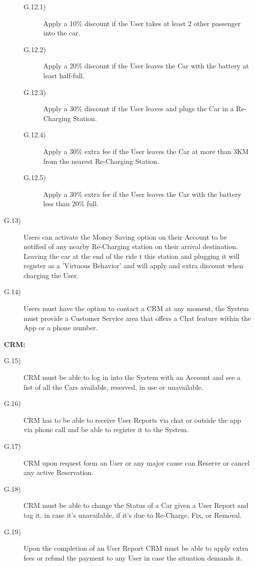 \documentclass[a4paper]{article}
\begin{document}
\begin{description}
\begin{description}
\item [G.12.1)]Apply a 10\% discount if the User takes at least 2 other passenger into the car.
\item [G.12.2)]Apply a 20\% discount if the User leaves the Car with the battery at least half-full.
\item [G.12.3)]Apply a 30\% discount if the User leaves and plugs the Car in a Re-Charging Station.
\item [G.12.4)]Apply a 30\% extra fee if the User leaves the Car at more than 3KM from the nearest Re-Charging Station.
\item [G.12.5)]Apply a 30\% extra fee if the User leaves the Car with the battery less than 20\% full.
\end{description}
\item [G.13)]Users can activate the Money Saving option on their Account to be notified of any nearby Re-Charging station on their arrival destination. Leaving the car at the end of the ride t this station and plugging it will register as a 'Virtuous Behavior' and will apply and extra discount when charging the User.
\item [G.14)]Users must have the option to contact a CRM at any moment, the System must provide a Customer Service area that offers a Chat feature within the App or a phone number.
\end{description}
\textbf{CRM:}
\begin{description}
\item [G.15)]CRM must be able to log in into the System with an Account and see a list of all the Cars available, reserved, in use or unavailable.
\item [G.16)]CRM has to be able to receive User Reports via chat or outside the app via phone call and be able to register it to the System.
\item [G.17)]CRM upon request form an User or any major cause can Reserve or cancel any active Reservation.
\item [G.18)]CRM must be able to change the Status of a Car given a User Report and tag it, in case it's unavailable, if it's due to Re-Charge, Fix, or Removal.
\item [G.19)]Upon the completion of an User Report CRM must be able to apply extra fees or refund the payment to any User in case the situation demands it.
\end {description}
\end{document}
